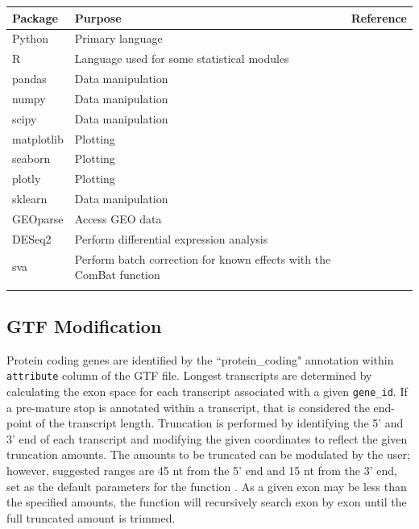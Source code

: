 \documentclass[11pt, a4paper, oneside]{article}
\begin{document}
\begin{tabular}{p{2.4cm}p{7.5cm}p{3cm}}
 \textbf{Package} & \textbf{Purpose} & \textbf{Reference} \\
 \hline
 Python & Primary language & \\
 \hline
 R & Language used for some statistical modules & \\
 \hline
 pandas & Data manipulation & \cite{pandas} \\
 \hline
 numpy & Data manipulation & \cite{numpy1, numpy2} \\
 \hline
 scipy & Data manipulation & \cite{scipy} \\
 \hline
 matplotlib & Plotting & \cite{matplotlib} \\
 \hline
 seaborn & Plotting & \cite{seaborn} \\
 \hline
 plotly & Plotting & \cite{plotly} \\
 \hline
 sklearn & Data manipulation & \cite{sklearn} \\
 \hline
 GEOparse & Access GEO data & \cite{geoparse} \\
 \hline
 DESeq2 & Perform differential expression analysis & \cite{deseq2} \\
 \hline
 sva & Perform batch correction for known effects with the ComBat function & \cite{sva} \\
 \label{Tab:software_plot}
 \end{tabular}
 \newline

\subsection{GTF Modification}
Protein coding genes are identified by the ``protein\_coding" annotation within \texttt{attribute} column of the GTF file.
Longest transcripts are determined by calculating the exon space for each transcript associated with a given \texttt{gene\_id}. If a pre-mature stop is annotated within a transcript, that is considered the end-point of the transcript length.
Truncation is performed by identifying the 5' and 3' end of each transcript and modifying the given coordinates to reflect the given truncation amounts. The amounts to be truncated can be modulated by the user; however, suggested ranges are 45 nt from the 5' end and 15 nt from the 3' end, set as the default parameters for the function \cite{ingolia_meth}. As a given exon may be less than the specified amounts, the function will recursively search exon by exon until the full truncated amount is trimmed.
\end{document}
